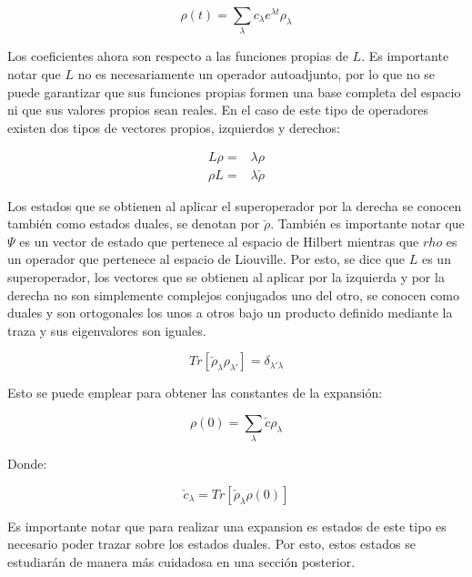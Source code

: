 \documentclass[a4paper,10pt]{report}
\begin{document}
\begin{equation}
\rho(t) = \sum_{\lambda} c_{\lambda} e^{\lambda t}\rho_{\lambda} 
\end{equation}

Los coeficientes ahora son respecto a las funciones propias de $L$. Es importante notar que $L$ no es necesariamente un operador autoadjunto, por lo que no se puede garantizar que sus funciones propias formen una base completa del espacio ni que sus valores propios sean reales. En el caso de este tipo de operadores existen dos tipos de vectores propios\cite{BarnettSD}, izquierdos y derechos:

\begin{align*}
L\rho =& \lambda \rho \\
\rho L =& \lambda \check{\rho}
\end{align*}

Los estados que se obtienen al aplicar el superoperador por la derecha se conocen también como estados duales, se denotan por $\check{\rho}$. También es importante notar que $\Psi$ es un vector de estado que pertenece al espacio de Hilbert mientras que $rho$ es un operador que pertenece al espacio de Liouville. Por esto, se dice que $L$ es un superoperador, los vectores que se obtienen al aplicar por la izquierda y por la derecha no son simplemente complejos conjugados uno del otro, se conocen como duales y son ortogonales los unos a otros bajo un producto definido mediante la traza\cite{EnglertDB} y sus eigenvalores son iguales.

\begin{equation}
Tr[\check{\rho}_\lambda \rho_{\lambda'}] = \delta_{\lambda'\lambda}
\end{equation}

Esto se puede emplear para obtener las constantes de la expansión:

\begin{equation}
\rho(0) = \sum_{\lambda} \check{c} \rho_{\lambda}
\end{equation}

Donde:

\begin{equation}
\check{c}_\lambda = Tr[\check{\rho}_\lambda \rho(0)]
\end{equation}

Es importante notar que para realizar una expansion es estados de este tipo es necesario poder trazar sobre los estados duales. Por esto, estos estados se estudiarán de manera más cuidadosa en una sección posterior.
\end{document}
